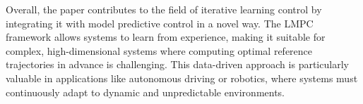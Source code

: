 \documentclass[a4paper,12pt]{article}
\begin{document}
Overall, the paper contributes to the field of iterative learning control by integrating it with model predictive control in a novel way. The LMPC framework allows systems to learn from experience, making it suitable for complex, high-dimensional systems where computing optimal reference trajectories in advance is challenging. This data-driven approach is particularly valuable in applications like autonomous driving or robotics, where systems must continuously adapt to dynamic and unpredictable environments.
\end{document}
